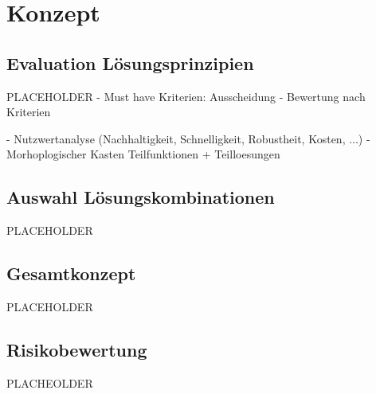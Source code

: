 \section{Konzept}

\subsection{Evaluation Lösungsprinzipien}

PLACEHOLDER
- Must have Kriterien: Ausscheidung
- Bewertung nach Kriterien

- Nutzwertanalyse (Nachhaltigkeit, Schnelligkeit, Robustheit, Kosten, ...)
- Morhoplogischer Kasten
Teilfunktionen + Teilloesungen

\subsection{Auswahl Lösungskombinationen}

PLACEHOLDER

\subsection{Gesamtkonzept}

PLACEHOLDER

\subsection{Risikobewertung}

PLACHEOLDER